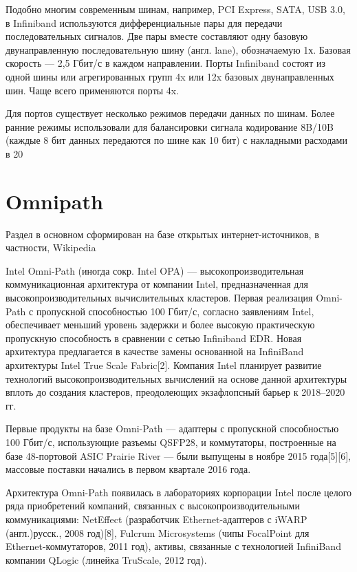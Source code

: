Подобно многим современным шинам, например, PCI Express, SATA, USB 3.0, в Infiniband используются дифференциальные пары для передачи последовательных сигналов. Две пары вместе составляют одну базовую двунаправленную последовательную шину (англ. lane), обозначаемую 1х. Базовая скорость — 2,5 Гбит/с в каждом направлении. Порты Infiniband состоят из одной шины или агрегированных групп 4x или 12x базовых двунаправленных шин. Чаще всего применяются порты 4x.

Для портов существует несколько режимов передачи данных по шинам. Более ранние режимы использовали для балансировки сигнала кодирование 8B/10B (каждые 8 бит данных передаются по шине как 10 бит) с накладными расходами в 20 %






\section{Omnipath}
Раздел в основном сформирован на базе открытых интернет-источников, в частности, Wikipedia 

Intel Omni-Path (иногда сокр. Intel OPA) — высокопроизводительная коммуникационная архитектура от компании Intel, предназначенная для высокопроизводительных вычислительных кластеров. Первая реализация Omni-Path с пропускной способностью 100 Гбит/с, согласно заявлениям Intel, обеспечивает меньший уровень задержки и более высокую практическую пропускную способность в сравнении с сетью Infiniband EDR. Новая архитектура предлагается в качестве замены основанной на InfiniBand архитектуры Intel True Scale Fabric[2]. Компания Intel планирует развитие технологий высокопроизводительных вычислений на основе данной архитектуры вплоть до создания кластеров, преодолеющих экзафлопсный барьер к 2018–2020 гг.

Первые продукты на базе Omni-Path — адаптеры с пропускной способностью 100 Гбит/с, использующие разъемы QSFP28, и коммутаторы, построенные на базе 48-портовой ASIC Prairie River — были выпущены в ноябре 2015 года[5][6], массовые поставки начались в первом квартале 2016 года.

Архитектура Omni-Path появилась в лабораториях корпорации Intel после целого ряда приобретений компаний, связанных с высокопроизводительными коммуникациями: NetEffect (разработчик Ethernet-адаптеров с iWARP (англ.)русск., 2008 год)[8], Fulcrum Microsystems (чипы FocalPoint для Ethernet-коммутаторов, 2011 год), активы, связанные с технологией InfiniBand компании QLogic (линейка TruScale, 2012 год).


    



